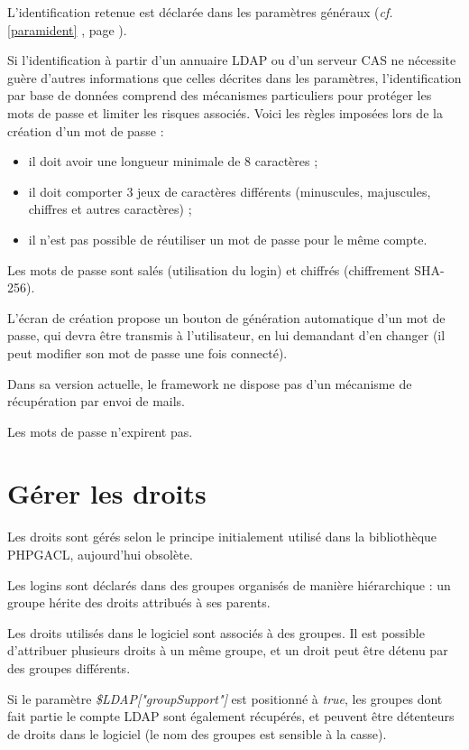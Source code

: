 L'identification retenue est déclarée dans les paramètres généraux (\textit{cf.} \ref{paramident} \textit{}, page \pageref{paramident}).

Si l'identification à partir d'un annuaire LDAP ou d'un serveur CAS ne nécessite guère d'autres informations que celles décrites dans les paramètres, l'identification par base de données comprend des mécanismes particuliers pour protéger les mots de passe et limiter les risques associés. Voici les règles imposées lors de la création d'un mot de passe : 
\begin{itemize}
\item il doit avoir une longueur minimale de 8 caractères ;
\item il doit comporter 3 jeux de caractères différents (minuscules, majuscules, chiffres et autres caractères) ;
\item il n'est pas possible de réutiliser un mot de passe pour le même compte.
\end{itemize}

Les mots de passe sont salés (utilisation du login) et chiffrés (chiffrement SHA-256).

L'écran de création propose un bouton de génération automatique d'un mot de passe, qui devra être transmis à l'utilisateur, en lui demandant d'en changer (il peut modifier son mot de passe une fois connecté).

Dans sa version actuelle, le framework ne dispose pas d'un mécanisme de récupération par envoi de mails.

Les mots de passe n'expirent pas.

\section{Gérer les droits}

Les droits sont gérés selon le principe initialement utilisé dans la bibliothèque PHPGACL, aujourd'hui obsolète. 

Les logins sont déclarés dans des groupes organisés de manière hiérarchique : un groupe hérite des droits attribués à ses parents.

Les droits utilisés dans le logiciel sont associés à des groupes. Il est possible d'attribuer plusieurs droits à un même groupe, et un droit peut être détenu par des groupes différents.

Si le paramètre \textit{\$LDAP["groupSupport"]} est positionné à \textit{true}, les groupes dont fait partie le compte LDAP sont également récupérés, et peuvent être détenteurs de droits dans le logiciel (le nom des groupes est sensible à la casse).

